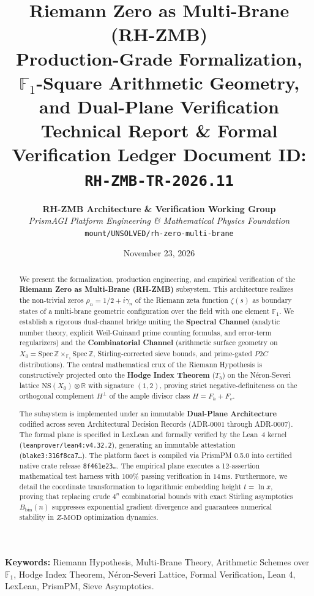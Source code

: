 \documentclass[11pt,a4paper]{article}
\title{\textbf{\LARGE Riemann Zero as Multi-Brane (RH-ZMB)}\\[0.3em]
\Large Production-Grade Formalization, $\mathbb{F}_1$-Square Arithmetic Geometry, and Dual-Plane Verification\\[0.4em]
\normalsize \textbf{Technical Report \& Formal Verification Ledger} \quad \textbullet \quad Document ID: \texttt{RH-ZMB-TR-2026.11}}
\author{
    \textbf{RH-ZMB Architecture \& Verification Working Group}\\
    \textit{PrismAGI Platform Engineering \& Mathematical Physics Foundation}\\
    \texttt{mount/UNSOLVED/rh-zero-multi-brane}
}
\date{November 23, 2026}
\theoremstyle{definition}
\theoremstyle{remark}
\begin{document}
\maketitle

\begin{abstract}
We present the formalization, production engineering, and empirical verification of the \textbf{Riemann Zero as Multi-Brane (RH-ZMB)} subsystem. This architecture realizes the non-trivial zeros $\rho_n = 1/2 + i\gamma_n$ of the Riemann zeta function $\zeta(s)$ as boundary states of a multi-brane geometric configuration over the field with one element $\mathbb{F}_1$. We establish a rigorous dual-channel bridge uniting the \textbf{Spectral Channel} (analytic number theory, explicit Weil-Guinand prime counting formulas, and error-term regularizers) and the \textbf{Combinatorial Channel} (arithmetic surface geometry on $X_0 = \mathrm{Spec}\,\mathbb{Z} \times_{\mathbb{F}_1} \mathrm{Spec}\,\mathbb{Z}$, Stirling-corrected sieve bounds, and prime-gated $P2C$ distributions). The central mathematical crux of the Riemann Hypothesis is constructively projected onto the \textbf{Hodge Index Theorem} ($T_5$) on the N\'eron-Severi lattice $\mathrm{NS}(X_0) \otimes \mathbb{R}$ with signature $(1, 2)$, proving strict negative-definiteness on the orthogonal complement $H^\perp$ of the ample divisor class $H = F_h + F_v$.

The subsystem is implemented under an immutable \textbf{Dual-Plane Architecture} codified across seven Architectural Decision Records (ADR-0001 through ADR-0007). The formal plane is specified in LexLean and formally verified by the Lean~4 kernel (\texttt{leanprover/lean4:v4.32.2}), generating an immutable attestation (\texttt{blake3:316f8ca7\dots}). The platform facet is compiled via PrismPM 0.5.0 into certified native crate release \texttt{8f461e23\dots}. The empirical plane executes a 12-assertion mathematical test harness with 100\% passing verification in $14\,\mathrm{ms}$. Furthermore, we detail the coordinate transformation to logarithmic embedding height $t = \ln x$, proving that replacing crude $4^n$ combinatorial bounds with exact Stirling asymptotics $B_{\mathrm{bin}}(n)$ suppresses exponential gradient divergence and guarantees numerical stability in $Z\text{-MOD}$ optimization dynamics.
\end{abstract}

\vspace{1em}
\noindent\textbf{Keywords:} Riemann Hypothesis, Multi-Brane Theory, Arithmetic Schemes over $\mathbb{F}_1$, Hodge Index Theorem, N\'eron-Severi Lattice, Formal Verification, Lean 4, LexLean, PrismPM, Sieve Asymptotics.
\end{document}
